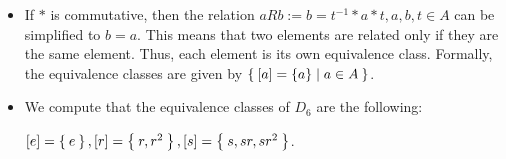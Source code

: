 \documentclass[12pt]{article}
\begin{document}
\begin{enumerate}[label = {\bfseries Question \arabic*:}, leftmargin=1in, itemsep=1.5em]
\begin{itemize}
        \item[(b)] If $\ast$ is commutative, then the relation $aRb := b=t^{-1}\ast a\ast t, a,b,t\in A$ can be simplified to $b=a$. This means that two elements are related only if they are the same element. Thus, each element is its own equivalence class. Formally, the equivalence classes are given by $\Set{[a]=\{a\}|a\in A}$.
        \item[(c)] We compute that the equivalence classes of $D_6$ are the following: \begin{center}
            $[e]=\Set{e}, [r]=\Set{r, r^2}, [s]=\Set{s, sr, sr^2}$.
        \end{center}
        \end{itemize}
\end{enumerate}
\end{document}
